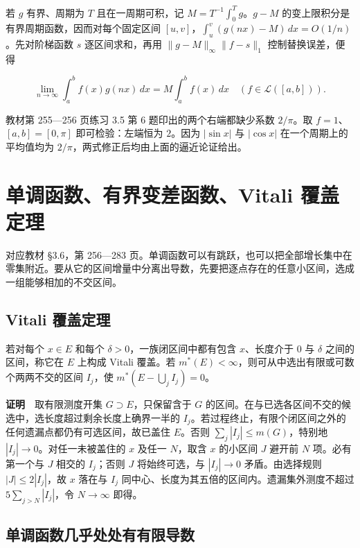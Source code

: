 \documentclass[11pt,a4paper]{article}
\begin{document}
若 \(g\) 有界、周期为 \(T\) 且在一周期可积，记 \(M=T^{-1}\int_0^Tg\)。\(g-M\) 的变上限积分是有界周期函数，因而对每个固定区间 \([u,v]\)，\(\int_u^v(g(nx)-M)\,dx=O(1/n)\)。先对阶梯函数 \(s\) 逐区间求和，再用 \(\|g-M\|_\infty\|f-s\|_1\) 控制替换误差，便得

\[
\lim_{n\to\infty}\int_a^b f(x)g(nx)\,dx=M\int_a^b f(x)\,dx
\quad(f\in\mathcal L([a,b])).
\]

教材第 255---256 页练习 3.5 第 6 题印出的两个右端都缺少系数 \(2/\pi\)。取 \(f=1\)、\([a,b]=[0,\pi]\) 即可检验：左端恒为 \(2\)。因为 \(|\sin x|\) 与 \(|\cos x|\) 在一个周期上的平均值均为 \(2/\pi\)，两式修正后均由上面的逼近论证给出。

\section{单调函数、有界变差函数、Vitali 覆盖定理}
对应教材 §3.6，第 256---283 页。单调函数可以有跳跃，也可以把全部增长集中在零集附近。要从它的区间增量中分离出导数，先要把逐点存在的任意小区间，选成一组能够相加的不交区间。

\subsection*{Vitali 覆盖定理}\label{vitali-ux8986ux76d6ux5b9aux7406}

若对每个 \(x\in E\) 和每个 \(\delta>0\)，一族闭区间中都有包含 \(x\)、长度介于 \(0\) 与 \(\delta\) 之间的区间，称它在 \(E\) 上构成 Vitali 覆盖。若 \(m^*(E)<\infty\)，则可从中选出有限或可数个两两不交的区间 \(I_j\)，使 \(m^*(E-\bigcup_j I_j)=0\)。

\textbf{证明}　取有限测度开集 \(G\supset E\)，只保留含于 \(G\) 的区间。在与已选各区间不交的候选中，选长度超过剩余长度上确界一半的 \(I_j\)。若过程终止，有限个闭区间之外的任何遗漏点都仍有可选区间，故已盖住 \(E\)。否则 \(\sum_j|I_j|\le m(G)\)，特别地 \(|I_j|\to0\)。对任一未被盖住的 \(x\) 及任一 \(N\)，取含 \(x\) 的小区间 \(J\) 避开前 \(N\) 项。必有第一个与 \(J\) 相交的 \(I_j\)；否则 \(J\) 将始终可选，与 \(|I_j|\to0\) 矛盾。由选择规则 \(|J|\le2|I_j|\)，故 \(x\) 落在与 \(I_j\) 同中心、长度为其五倍的区间内。遗漏集外测度不超过 \(5\sum_{j>N}|I_j|\)，令 \(N\to\infty\) 即得。

\subsection*{单调函数几乎处处有有限导数}\label{ux5355ux8c03ux51fdux6570ux51e0ux4e4eux5904ux5904ux6709ux6709ux9650ux5bfcux6570}
\end{document}
